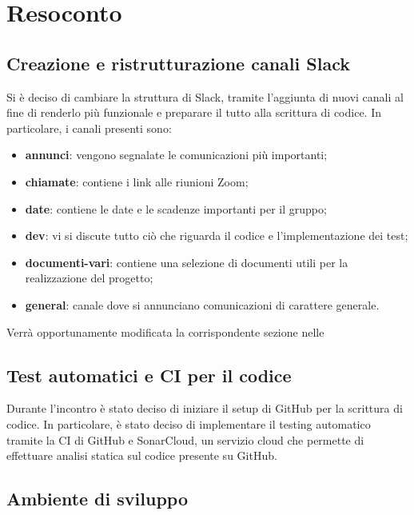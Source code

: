 \newpage


\section{Resoconto}

\subsection{Creazione e ristrutturazione canali Slack}

Si è deciso di cambiare la struttura di Slack, tramite l'aggiunta di nuovi canali al fine di renderlo più funzionale e preparare il tutto alla scrittura di codice. In particolare, i canali presenti sono:
\begin{itemize}

\item \textbf{annunci}: vengono segnalate le comunicazioni più importanti;
\item \textbf{chiamate}: contiene i link alle riunioni Zoom;
\item \textbf{date}: contiene le date e le scadenze importanti per il gruppo;
\item \textbf{dev}: vi si discute tutto ciò che riguarda il codice e l'implementazione dei test;
\item \textbf{documenti-vari}: contiene una selezione di documenti utili per la realizzazione del progetto;
\item \textbf{general}: canale dove si annunciano comunicazioni di carattere generale.

\end{itemize}
Verrà opportunamente modificata la corrispondente sezione nelle \NdP{}

\subsection{Test automatici e CI per il codice}

Durante l'incontro è stato deciso di iniziare il setup di GitHub per la scrittura di codice. In particolare, è stato deciso di implementare il testing automatico tramite la CI di GitHub e SonarCloud, un servizio cloud che permette di effettuare analisi statica sul codice presente su GitHub. 

\subsection{Ambiente di sviluppo }

